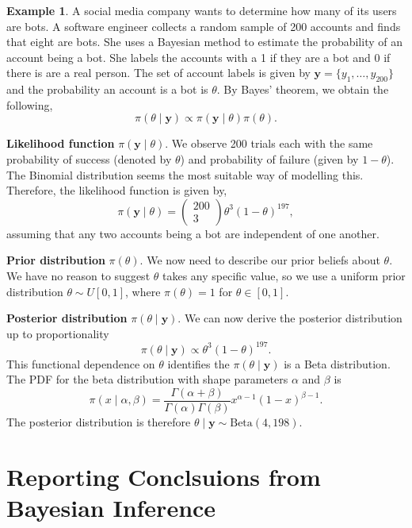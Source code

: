 \documentclass[
]{book}
\theoremstyle{definition}
\theoremstyle{definition}
\newtheorem{example}{Example}[chapter]
\theoremstyle{definition}
\theoremstyle{definition}
\theoremstyle{remark}
\begin{document}
\begin{example}
\protect\hypertarget{exm:binom}{}\label{exm:binom}A social media company wants to determine how many of its users are bots. A software engineer collects a random sample of 200 accounts and finds that eight are bots. She uses a Bayesian method to estimate the probability of an account being a bot. She labels the accounts with a 1 if they are a bot and 0 if there is are a real person. The set of account labels is given by \(\boldsymbol{y} = \{y_1, \ldots, y_{200}\}\) and the probability an account is a bot is \(\theta\). By Bayes' theorem, we obtain the following,
\[
\pi(\theta \mid \boldsymbol{y}) \propto \pi(\boldsymbol{y}\mid \theta) \pi(\theta).
\]

\textbf{Likelihood function} \(\pi(\boldsymbol{y}\mid \theta)\). We observe 200 trials each with the same probability of success (denoted by \(\theta\)) and probability of failure (given by \(1-\theta\)). The Binomial distribution seems the most suitable way of modelling this. Therefore, the likelihood function is given by,
\[
\pi(\boldsymbol{y}\mid \theta) = \begin{pmatrix} 200 \\ 3 \end{pmatrix} \theta^3(1-\theta)^{197},
\]
assuming that any two accounts being a bot are independent of one another.

\textbf{Prior distribution} \(\pi(\theta)\). We now need to describe our prior beliefs about \(\theta\). We have no reason to suggest \(\theta\) takes any specific value, so we use a uniform prior distribution \(\theta \sim U[0, 1]\), where \(\pi(\theta) = 1\) for \(\theta \in [0, 1]\).

\textbf{Posterior distribution} \(\pi(\theta \mid \boldsymbol{y})\). We can now derive the posterior distribution up to proportionality
\[
\pi(\theta \mid \boldsymbol{y}) \propto \theta^3(1-\theta)^{197}. 
\]
This functional dependence on \(\theta\) identifies the \(\pi(\theta \mid \boldsymbol{y})\) is a Beta distribution. The PDF for the beta distribution with shape parameters \(\alpha\) and \(\beta\) is
\[
\pi(x \mid \alpha, \beta) = \frac{\Gamma(\alpha + \beta)}{\Gamma(\alpha)\Gamma(\beta)}x^{\alpha - 1}(1-x)^{\beta - 1}. 
\]
The posterior distribution is therefore \(\theta \mid \boldsymbol{y} \sim \textrm{Beta}(4, 198)\).
\end{example}

\hypertarget{reporting-conclsuions-from-bayesian-inference}{%
\section{Reporting Conclsuions from Bayesian Inference}\label{reporting-conclsuions-from-bayesian-inference}}
\end{document}
